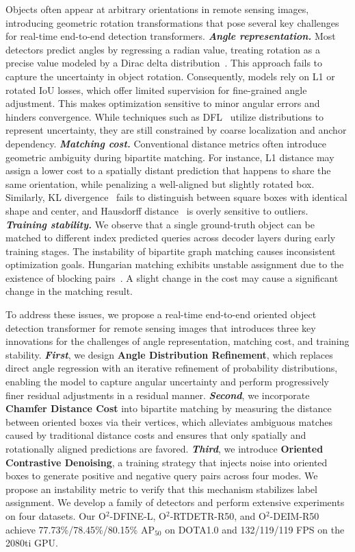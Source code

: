 \documentclass[lettersize,journal]{IEEEtran}
\begin{document}
Objects often appear at arbitrary orientations in remote sensing images, introducing geometric rotation transformations that pose several key challenges for real-time end-to-end detection transformers.
 \textbf{\textit{Angle representation.}} Most detectors predict angles by regressing a radian value, treating rotation as a precise value modeled by a Dirac delta distribution~\cite{rtmdet}. This approach fails to capture the uncertainty in object rotation. Consequently, models rely on L1 or rotated IoU losses, which offer limited supervision for fine-grained angle adjustment. This makes optimization sensitive to minor angular errors and hinders convergence. While techniques such as DFL~\cite{ppyoloer} utilize distributions to represent uncertainty, they are still constrained by coarse localization and anchor dependency.
 \textbf{\textit{Matching cost.}} Conventional distance metrics often introduce geometric ambiguity during bipartite matching. For instance, L1 distance may assign a lower cost to a spatially distant prediction that happens to share the same orientation, while penalizing a well-aligned but slightly rotated box. Similarly, KL divergence~\cite{kld} fails to distinguish between square boxes with identical shape and center, and Hausdorff distance~\cite{rhino} is overly sensitive to outliers.
 \textbf{\textit{Training stability.}} We observe that a single ground-truth object can be matched to different index predicted queries across decoder layers during early training stages. The instability of bipartite graph matching causes inconsistent optimization goals. Hungarian matching exhibits unstable assignment due to the existence of blocking pairs~\cite{blockpair}. A slight change in the cost may cause a significant change in the matching result. 


To address these issues, we propose a real-time end-to-end oriented object detection transformer for remote sensing images that introduces three key innovations for the challenges of angle representation, matching cost, and training stability. 
\textit{\textbf{First}}, we design \textbf{Angle Distribution Refinement}, which replaces direct angle regression with an iterative refinement of probability distributions, enabling the model to capture angular uncertainty and perform progressively finer residual adjustments in a residual manner.
\textit{\textbf{Second}}, we incorporate \textbf{Chamfer Distance Cost} into bipartite matching by measuring the distance between oriented boxes via their vertices, which alleviates ambiguous matches caused by traditional distance costs and ensures that only spatially and rotationally aligned predictions are favored.
\textit{\textbf{Third}}, we introduce \textbf{Oriented Contrastive Denoising}, a training strategy that injects noise into oriented boxes to generate positive and negative query pairs across four modes. We propose an instability metric to verify that this mechanism stabilizes label assignment.
We develop a family of detectors and perform extensive experiments on four datasets. Our O$^2$-DFINE-L, O$^2$-RTDETR-R50, and O$^2$-DEIM-R50 achieve 77.73\%/78.45\%/80.15\% AP$_{50}$ on DOTA1.0 and 132/119/119 FPS on the 2080ti GPU.
\end{document}
